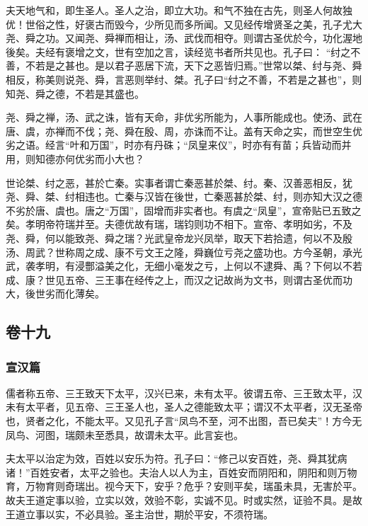 \documentclass[]{article}
\begin{document}
夫天地气和，即生圣人。圣人之治，即立大功。和气不独在古先，则圣人何故独优！世俗之性，好褒古而毁今，少所见而多所闻。又见经传增贤圣之美，孔子尤大尧、舜之功。又闻尧、舜禅而相让，汤、武伐而相夺。则谓古圣优於今，功化渥地後矣。夫经有褒增之文，世有空加之言，读经览书者所共见也。孔子曰：
``纣之不善，不若是之甚也。是以君子恶居下流，天下之恶皆归焉。''世常以桀、纣与尧、舜相反，称美则说尧、舜，言恶则举纣、桀。孔子曰``纣之不善，不若是之甚也''，则知尧、舜之德，不若是其盛也。

尧、舜之禅，汤、武之诛，皆有天命，非优劣所能为，人事所能成也。使汤、武在唐、虞，亦禅而不伐；尧、舜在殷、周，亦诛而不让。盖有天命之实，而世空生优劣之语。经言``叶和万国''，时亦有丹硃；``凤皇来仪''，时亦有有苗；兵皆动而并用，则知德亦何优劣而小大也？

世论桀、纣之恶，甚於亡秦。实事者谓亡秦恶甚於桀、纣。秦、汉善恶相反，犹尧、舜、桀、纣相违也。亡秦与汉皆在後世，亡秦恶甚於桀、纣，则亦知大汉之德不劣於唐、虞也。唐之``万国''，固增而非实者也。有虞之``凤皇''，宣帝贴已五致之矣。孝明帝符瑞并至。夫德优故有瑞，瑞钧则功不相下。宣帝、孝明如劣，不及尧、舜，何以能致尧、舜之瑞？光武皇帝龙兴凤举，取天下若拾遗，何以不及殷汤、周武？世称周之成、康不亏文王之隆，舜巍位亏尧之盛功也。方今圣朝，承光武，袭孝明，有浸酆溢美之化，无细小毫发之亏，上何以不逮舜、禹？下何以不若成、康？世见五帝、三王事在经传之上，而汉之记故尚为文书，则谓古圣优而功大，後世劣而化薄矣。

\hypertarget{header-n775}{%
\subsection{卷十九}\label{header-n775}}

\hypertarget{header-n776}{%
\subsubsection{宣汉篇}\label{header-n776}}

儒者称五帝、三王致天下太平，汉兴已来，未有太平。彼谓五帝、三王致太平，汉未有太平者，见五帝、三王圣人也，圣人之德能致太平；谓汉不太平者，汉无圣帝也，贤者之化，不能太平。又见孔子言``凤鸟不至，河不出图，吾已矣夫''！方今无凤鸟、河图，瑞颇未至悉具，故谓未太平。此言妄也。

夫太平以治定为效，百姓以安乐为符。孔子曰：``修己以安百姓，尧、舜其犹病诸！''百姓安者，太平之验也。夫治人以人为主，百姓安而阴阳和，阴阳和则万物育，万物育则奇瑞出。视今天下，安乎？危乎？安则平矣，瑞虽未具，无害於平。故夫王道定事以验，立实以效，效验不彰，实诚不见。时或实然，证验不具。是故王道立事以实，不必具验。圣主治世，期於平安，不须符瑞。
\end{document}
